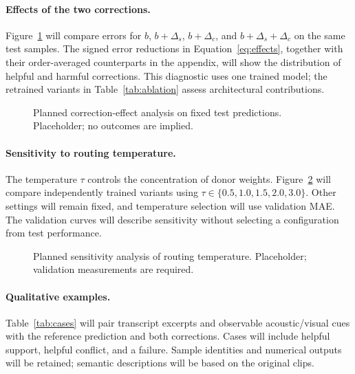 \documentclass[review,12pt]{elsarticle}
\newcommand{\MAE}{\operatorname{MAE}}
\begin{document}
\paragraph{Effects of the two corrections.}
Figure~\ref{fig:corrections} will compare errors for $b$, $b+\Delta_s$, $b+\Delta_c$, and $b+\Delta_s+\Delta_c$ on the same test samples. The signed error reductions in Equation~\eqref{eq:effects}, together with their order-averaged counterparts in the appendix, will show the distribution of helpful and harmful corrections. This diagnostic uses one trained model; the retrained variants in Table~\ref{tab:ablation} assess architectural contributions.

\begin{figure}[t]
\centering
{}
\caption{Planned correction-effect analysis on fixed test predictions. Placeholder; no outcomes are implied.}
\label{fig:corrections}
\end{figure}

\paragraph{Sensitivity to routing temperature.}
The temperature $\tau$ controls the concentration of donor weights. Figure~\ref{fig:sensitivity} will compare independently trained variants using $\tau\in\{0.5,1.0,1.5,2.0,3.0\}$. Other settings will remain fixed, and temperature selection will use validation MAE. The validation curves will describe sensitivity without selecting a configuration from test performance.

\begin{figure}[t]
\centering
{}
\caption{Planned sensitivity analysis of routing temperature. Placeholder; validation measurements are required.}
\label{fig:sensitivity}
\end{figure}

\paragraph{Qualitative examples.}
Table~\ref{tab:cases} will pair transcript excerpts and observable acoustic/visual cues with the reference prediction and both corrections. Cases will include helpful support, helpful conflict, and a failure. Sample identities and numerical outputs will be retained; semantic descriptions will be based on the original clips.
\end{document}
